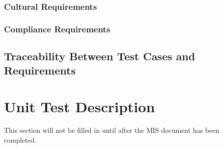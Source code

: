 \documentclass[12pt, titlepage]{article}
\begin{document}
\subsubsection{Cultural Requirements}

\subsubsection{Compliance Requirements}

\subsection{Traceability Between Test Cases and Requirements}


\section{Unit Test Description}
This section will not be filled in until after the MIS document has been completed.




\end{document}
